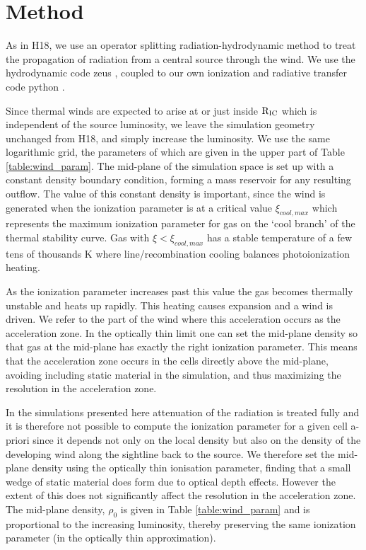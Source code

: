 \documentclass[a4paper,fleqn,usenatbib]{mnras}
\begin{document}
 

\section{Method}

As in H18, we use an operator splitting radiation-hydrodynamic method to treat the propagation of radiation
from a central source through the wind. We use the hydrodynamic code {\sc zeus} 
\citep[][extended by \citealt{2000ApJ...543..686P}]{1992ApJS...80..753S}, coupled to our own ionization and
 radiative transfer code {\sc python} \citep[][extended by \citealt{,2013MNRAS.436.1390H} and 
 \citealt{2015MNRAS.450.3331M}]{2002ApJ...579..725L}. 

Since thermal winds are expected to arise at or just inside $\rm{R_{IC}}$ which is independent of the source luminosity, we leave the simulation geometry unchanged
from H18, and simply increase the luminosity. We use the same logarithmic grid, the parameters of which are given in the upper
part of Table \ref{table:wind_param}. The mid-plane of the simulation space is set up with a constant 
density boundary condition, forming a mass reservoir for any resulting outflow. The value of this constant density
is important, since the wind is generated when the ionization parameter is at a critical value $\xi_{cool,max}$ which
represents the maximum ionization parameter for gas on the `cool branch' of the thermal stability curve. Gas with
$\xi<\xi_{cool,max}$ has a stable temperature of a few tens of thousands K where line/recombination cooling 
balances photoionization heating. 

As the 
ionization parameter increases past this value the gas becomes thermally unstable and heats up rapidly. This heating causes expansion and
a wind is driven. We refer to the part of the wind where this acceleration occurs as the acceleration zone.
In the optically thin limit one can set the mid-plane density so that gas at the mid-plane has
exactly the right ionization parameter. This means that the acceleration zone occurs in the cells directly above the mid-plane, avoiding including static material in the simulation, and thus maximizing the resolution in the acceleration zone.

In the simulations presented here attenuation of the radiation is treated fully and it is therefore not possible to compute the ionization parameter for a given cell a-priori since it depends not only on the local density  but also on the density of the developing wind along the 
sightline back to the source. 
We therefore set the mid-plane density using the optically thin ionisation parameter,
finding that a small wedge of static material does form due to optical depth effects. However the extent of this does not significantly
affect the resolution in the acceleration zone. The mid-plane density, $\rho_0$ is given in Table
\ref{table:wind_param} and is proportional to the increasing luminosity, thereby preserving the same
ionization parameter (in the optically thin approximation).
\end{document}
